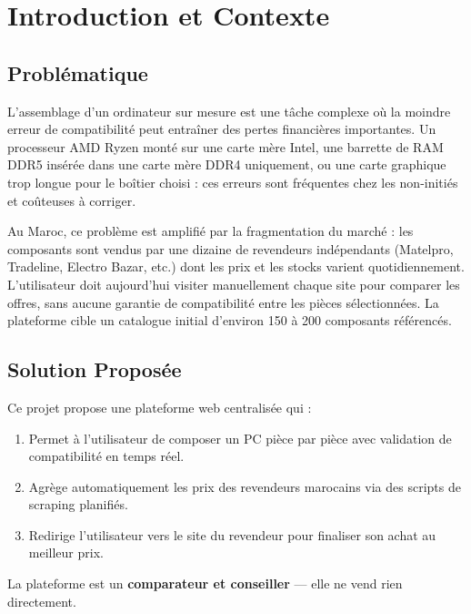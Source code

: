 \documentclass[12pt,a4paper]{article}
\begin{document}
\newpage

\section{Introduction et Contexte}

\subsection{Problématique}

L'assemblage d'un ordinateur sur mesure est une tâche complexe où la moindre erreur de compatibilité peut entraîner des pertes financières importantes. Un processeur AMD Ryzen monté sur une carte mère Intel, une barrette de RAM DDR5 insérée dans une carte mère DDR4 uniquement, ou une carte graphique trop longue pour le boîtier choisi : ces erreurs sont fréquentes chez les non-initiés et coûteuses à corriger.

Au Maroc, ce problème est amplifié par la fragmentation du marché : les composants sont vendus par une dizaine de revendeurs indépendants (Matelpro, Tradeline, Electro Bazar, etc.) dont les prix et les stocks varient quotidiennement. L'utilisateur doit aujourd'hui visiter manuellement chaque site pour comparer les offres, sans aucune garantie de compatibilité entre les pièces sélectionnées. La plateforme cible un catalogue initial d'environ 150 à 200 composants référencés.

\subsection{Solution Proposée}

Ce projet propose une plateforme web centralisée qui :
\begin{enumerate}
  \item Permet à l'utilisateur de composer un PC pièce par pièce avec validation de compatibilité en temps réel.
  \item Agrège automatiquement les prix des revendeurs marocains via des scripts de scraping planifiés.
  \item Redirige l'utilisateur vers le site du revendeur pour finaliser son achat au meilleur prix.
\end{enumerate}

La plateforme est un \textbf{comparateur et conseiller} — elle ne vend rien directement.
\end{document}
